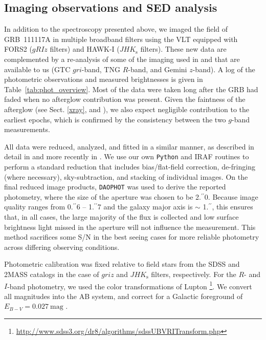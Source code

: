 \documentclass[longauth]{aa}    %
\newcommand{\farc}{\hbox{$.\!\!^{\prime\prime}$}}
\begin{document}
\subsection{Imaging observations and SED analysis} \label{SED}

In addition to the spectroscopy presented above, we imaged the field of
GRB~111117A in multiple broadband filters using the VLT equipped with FORS2
($gRIz$ filters) and HAWK-I ($JHK_{\mathrm{s}}$ filters). These new data are
complemented by a re-analysis of some of the imaging used in
\citet{Margutti2012} and \citet{Sakamoto2013} that are available to us (GTC
$gri$-band, TNG $R$-band, and Gemini $z$-band). A log of the photometric
observations and measured brightnesses is given in
Table~\ref{tab:phot_overview}. Most of the data were taken long after the GRB had faded
when no afterglow contribution was present. Given the faintness of the afterglow
(see Sect. \ref{xray}, and \citealt{Cucchiara2011, Cenko2011}), we also expect
negligible contribution to the earliest epochs, which is confirmed by the
consistency between the two $g$-band measurements.

All data were reduced, analyzed, and fitted in a similar manner, as described in
detail in \citet{Kruhler2011a} and more recently in \citet{Schulze2016}. We
use our own \texttt{Python} and IRAF routines to perform a standard reduction that  includes bias/flat-field correction, de-fringing (where necessary),
sky-subtraction, and stacking of individual images. On the final reduced image
products, \texttt{DAOPHOT} \citep{Stetson1987} was used to derive the reported
photometry, where the size of the aperture was chosen to be 2\farc0. Because
image quality ranges from 0\farc6 -- 1\farc7 and the galaxy major axis is $\sim$
1\farc, this ensures that, in all cases, the large majority of the flux is
collected and low surface brightness light missed in the aperture will not
influence the measurement. This method sacrifices some S/N in the best seeing
cases for more reliable photometry across differing observing conditions.

Photometric calibration was fixed relative to field stars from the SDSS and
2MASS catalogs in the case of $griz$ and $JHK_{\mathrm{s}}$ filters,
respectively. For the $R$- and $I$-band photometry, we used the color
transformations of Lupton%
\footnote{\url{http://www.sdss3.org/dr8/algorithms/sdssUBVRITransform.php}}. We
convert all magnitudes into the AB system, and correct for a Galactic foreground
of $E_{B-V}=0.027~\mathrm{mag}$ \citep{Schlegel1998, Schlafly2011}.
\end{document}
